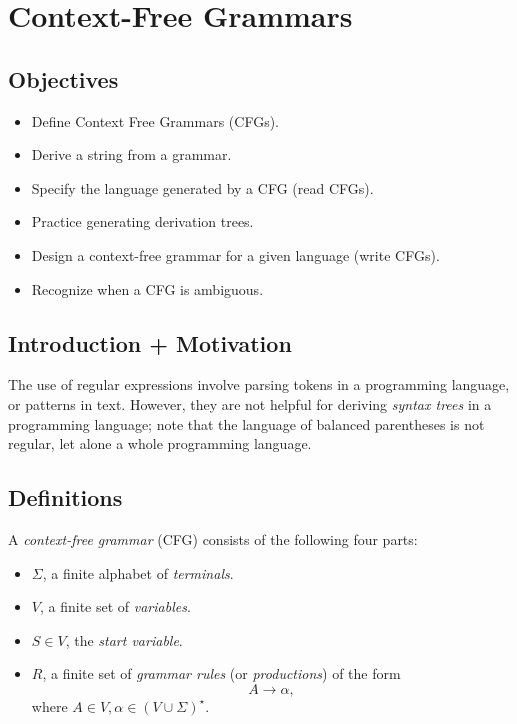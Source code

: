 \chapter{Context-Free Grammars}

\section{Objectives}

\begin{itemize}
	\item Define Context Free Grammars (CFGs).
	\item Derive a string from a grammar.
	\item Specify the language generated by a CFG (read CFGs).
	\item Practice generating derivation trees.
	\item Design a context-free grammar for a given language (write CFGs).
	\item Recognize when a CFG is ambiguous.
\end{itemize}

\section{Introduction + Motivation}

The use of regular expressions involve parsing tokens in a programming language, or patterns in text.
However, they are not helpful for deriving \emph{syntax trees} in a programming language; note that the language of balanced parentheses is not regular, let alone a whole programming language.

\section{Definitions}

A \emph{context-free grammar} (CFG) consists of the following four parts:
\begin{itemize}
	\item $\Sigma$, a finite alphabet of \emph{terminals}.
	\item $V$, a finite set of \emph{variables}.
	\item $S \in V$, the \emph{start variable}.
	\item $R$, a finite set of \emph{grammar rules} (or \emph{productions}) of the form
	\[
		A \to \alpha,
	\]
	where $A \in V, \alpha \in (V \cup \Sigma)^\star$.
\end{itemize}

